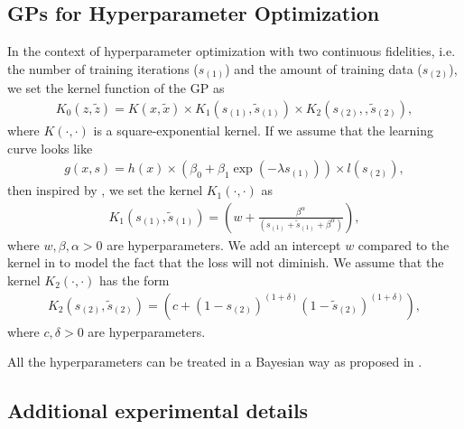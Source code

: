 \documentclass[letterpaper]{article}
\numberwithin{equation}{section}
\begin{document}
\subsection{GPs for Hyperparameter Optimization}
\label{sect:gp-ho}
In the context of hyperparameter optimization with two continuous fidelities, i.e. the number of training iterations ($s_{(1)}$) and the amount of training data ($s_{(2)}$), we set the kernel function of the GP as
\begin{eqnarray*}
K_{0}(z, \tilde z) = K(x, \tilde x) \times K_1(s_{(1)}, \tilde s_{(1)}) \times K_2(s_{(2)},, \tilde s_{(2)}),
\end{eqnarray*}
where $K(\cdot, \cdot)$ is a square-exponential kernel. If we assume that the learning curve looks like
\begin{eqnarray}
g(x, s) = h(x) \times \left(\beta_0 + \beta_1\exp{(-\lambda s_{(1)})}\right) \times l(s_{(2)}),
\label{eqn:shape}
\end{eqnarray}
then inspired by \cite{swersky2014freeze}, we set the kernel $K_1(\cdot, \cdot)$ as
\begin{eqnarray*}
K_1(s_{(1)}, \tilde s_{(1)}) = \left( w + \frac{\beta^{\alpha}}{(s_{(1)} + \tilde s_{(1)} + \beta^{\alpha})}\right),
\end{eqnarray*}
where $w, \beta, \alpha > 0$ are hyperparameters. We add an intercept $w$ compared to the kernel in \cite{swersky2014freeze} to model the fact that the loss will not diminish. We assume that the kernel $K_2(\cdot, \cdot)$ has the form
\begin{eqnarray*}
K_2(s_{(2)}, \tilde s_{(2)}) = \left(c + (1-s_{(2)})^{(1+\delta)}(1-\tilde s_{(2)})^{(1+\delta)}\right),
\end{eqnarray*}
where $c, \delta > 0$ are hyperparameters.

All the hyperparameters can be treated in a Bayesian way as proposed in \citet{snoek2012practical}.

\subsection{Additional experimental details}
\label{sect:addition}
\end{document}
